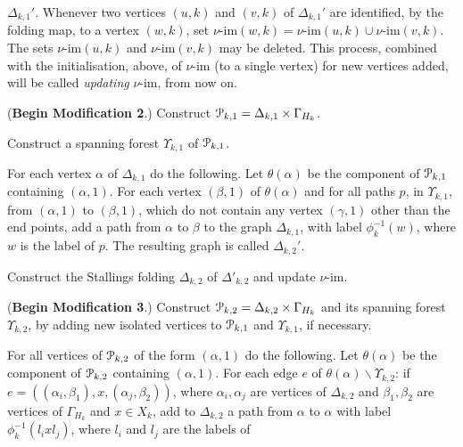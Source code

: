 \documentclass[a4paper,12pt]{article}
\renewcommand{\a}{\alpha }
\renewcommand{\b}{\beta }
\newcommand{\G}{\Gamma }
\newcommand{\g}{\gamma }
\newcommand{\D}{\Delta }
\newcommand{\U}{\Upsilon }
\newcommand{\cP}{{\cal{P}}}
\newcommand{\vim}{\nu\textrm{-im}}
\numberwithin{equation}{section}
\numberwithin{figure}{section}
\newcommand{\bs}{\backslash}
\begin{document}
$\D_{k,1}'$.  
Whenever two vertices $(u,k)$ and $(v,k)$
of $\D_{k,1}'$ are identified, by the folding map, to a vertex $(w,k)$, 
set $\vim(w,k)=\vim(u,k)\cup \vim(v,k)$. 
The sets $\vim(u,k)$ and $\vim(v,k)$ may be deleted.  This process, combined 
with the initialisation, above, of $\vim$ (to a single vertex) for new vertices
added,  will be
called \emph{updating}
$\vim$, from now on. 
\item\label{it:D4} (\textbf{Begin Modification 2}.)
 Construct $\cP_{k,1}=\D_{k,1}\times \G_{H_k}$.
\item\label{it:D5} Construct a spanning forest $\U_{k,1}$ of $\cP_{k,1}$.

\item\label{it:D6} For each vertex $\a$ of $\D_{k,1}$ do the following.
 Let
$\theta(\a)$ be the component of $\cP_{k,1}$ containing $(\a,1)$.
For each vertex $(\b,1)$ of $\theta(\a)$ and for all paths $p$, in $\U_{k,1}$,  from
$(\a,1)$ to $(\b,1)$, which do not contain  any vertex $(\g,1)$ other than
the end points, 
 add a path from $\a$ to $\b$ to the graph $\D_{k,1}$, with
label $\phi_k^{-1}(w)$, where $w$ is the label of $p$.
The resulting graph is called $\D_{k,2}'$.
\item\label{it:D7} Construct the Stallings folding $\D_{k,2}$ of $\D'_{k,2}$ and update $\vim$.
\item\label{it:D8} (\textbf{Begin Modification 3}.)
 Construct $\cP_{k,2}=\D_{k,2}\times \G_{H_k}$ and its spanning
 forest $\U_{k,2}$, by adding new isolated vertices to $\cP_{k,1}$ and 
$\U_{k,1}$,
if necessary. 
\item\label{it:D9} For all vertices of $\cP_{k,2}$ of the 
form $(\a,1)$ do the following.
Let $\theta(\a)$ be the component of $\cP_{k,2}$ containing $(\a,1)$.
For each edge $e$ of $\theta(\a)\bs \U_{k,2}$: 
if $e=((\a_i,\b_1),x ,(\a_j,\b_2))$,
where $\a_i,\a_j$ are vertices of $\D_{k,2}$ and $\b_1,\b_2$ are vertices
of $\G_{H_k}$ and $x\in X_k$, add to $\D_{k,2}$ a path from $\a$ to $\a$ with
label $\phi_k^{-1}(l_ixl_j)$, where $l_i$ and $l_j$ are the labels of
\end{document}
